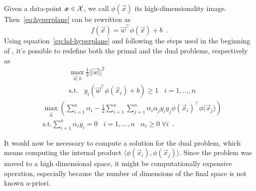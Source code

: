 Given a data-point $\boldsymbol{x} \in \mathcal{X}$, we call $\phi(\vec{x})$ its high-dimensionality image.
Then~\ref{eq:hyperplane} can be rewritten as
\begin{equation}
	\label{ep:hd-hyperplane}
	f(\vec{x}) = \vec{w}^\top \phi(\vec{x}) + b \enspace.
\end{equation}
Using equation~\ref{ep:hd-hyperplane} and following the steps used in the beginning of ,
it's possible to redefine both the primal and the dual problems, respectively as
\begin{equation}
	\label{eq:hd-primal}
	\begin{aligned}
		 & \max_{\vec{w}, b}\frac{1}{2}||\vec{w}||^2                                                         \\
		 & \text{s.t.}\hspace{10pt}y_i(\vec{w}^\top\phi(\vec{x}_i) + b) \geq 1 \hspace{10pt}i = 1, \ldots, n
	\end{aligned}
\end{equation}
\begin{equation}
	\label{eq:hd-dual}
	\begin{aligned}
		 & \max_{\vec{\alpha}}\left(\sum_{i = 1}^n{\alpha_i} - \frac{1}{2}\sum_{i =
		1}^n\sum_{j = 1}^n{\alpha_i\alpha_j y_i y_j \phi(\vec{x}_i)^\top\phi(\vec{x}_j})\right) \\
		 & \text{s.t.} \sum_{i = 1}^n{\alpha_i y_i} = 0 \hspace{10pt} i = 1, \ldots, n
		 \hspace{10pt}\alpha_i \geq 0 \hspace{3pt} \forall i \enspace.
	\end{aligned}
\end{equation}

It would now be necessary to compute a solution for the dual problem, which means computing the
internal product $\langle\phi(\vec{x}_i), \phi(\vec{x}_j)\rangle$. Since the problem was moved to a
high dimensional space, it might be computationally expensive operation, especially because the
number of dimensions of the final space is not known a-priori.

